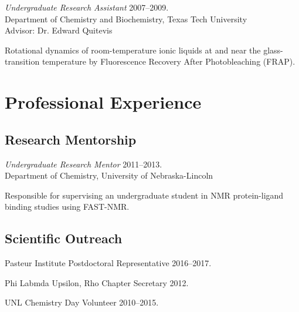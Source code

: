 \documentclass[letterpaper]{article}
\renewenvironment{itemize}{
  \begin{list}{}{
    \setlength{\leftmargin}{1.5em}
  }
}{
  \end{list}
}
\begin{document}
\begin{itemize}
\item{
  {\it Undergraduate Research Assistant}
  \hfill 2007--2009. \\
  Department of Chemistry and Biochemistry, Texas Tech University \\
  {\setlength{\topmargin}{0pt} Advisor: Dr. Edward Quitevis}
  \begin{enumerate*}
    \item Rotational dynamics of room-temperature ionic liquids at and near
      the glass-transition temperature by Fluorescence Recovery After
      Photobleaching (FRAP).
  \end{enumerate*}
}
\end{itemize}


\section*{Professional Experience}

\subsection*{Research Mentorship}

\begin{itemize}
\item{
  {\it Undergraduate Research Mentor}
  \hfill 2011--2013. \\
  Department of Chemistry, University of Nebraska-Lincoln
  \begin{enumerate*}
    \item Responsible for supervising an undergraduate student in NMR
      protein-ligand binding studies using FAST-NMR.
  \end{enumerate*}
}
\end{itemize}

\subsection*{Scientific Outreach}

\begin{itemize}
 \item Pasteur Institute Postdoctoral Representative \hfill 2016--2017.
 \item Phi Labmda Upsilon, Rho Chapter Secretary \hfill 2012.
 \item UNL Chemistry Day Volunteer \hfill 2010--2015.
\end{itemize}
\end{document}

